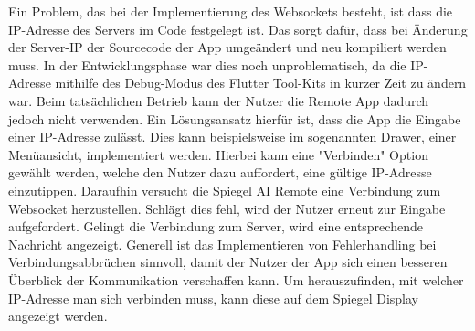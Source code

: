 Ein Problem, das bei der Implementierung des Websockets besteht, ist dass die IP-Adresse des Servers im Code festgelegt ist. Das sorgt dafür, dass bei Änderung der Server-IP der Sourcecode der App umgeändert und neu kompiliert werden muss. In der Entwicklungsphase war dies noch unproblematisch, da die IP-Adresse mithilfe des Debug-Modus des Flutter Tool-Kits in kurzer Zeit zu ändern war. Beim tatsächlichen Betrieb kann der Nutzer die Remote App dadurch jedoch nicht verwenden. Ein Lösungsansatz hierfür ist, dass die App die Eingabe einer IP-Adresse zulässt. Dies kann beispielsweise im sogenannten Drawer, einer Menüansicht, implementiert werden. Hierbei kann eine "Verbinden" Option gewählt werden, welche den Nutzer dazu auffordert, eine gültige IP-Adresse einzutippen. Daraufhin versucht die Spiegel AI Remote eine Verbindung zum Websocket herzustellen. Schlägt dies fehl, wird der Nutzer erneut zur Eingabe aufgefordert. Gelingt die Verbindung zum Server, wird eine entsprechende Nachricht angezeigt. Generell ist das Implementieren von Fehlerhandling bei Verbindungsabbrüchen sinnvoll, damit der Nutzer der App sich einen besseren Überblick der Kommunikation verschaffen kann. Um herauszufinden, mit welcher IP-Adresse man sich verbinden muss, kann diese auf dem Spiegel Display angezeigt werden.

